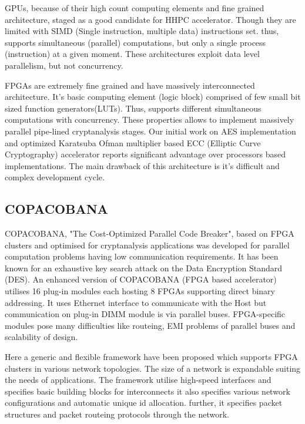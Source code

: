 \documentclass[10pt, conference, compsocconf]{IEEEtran}
\begin{document}
GPUs, because of their high count computing elements and fine grained architecture, staged as a good candidate for HHPC accelerator. Though they are limited with SIMD (Single instruction, multiple data) instructions set. thus, supports simultaneous (parallel) computations, but only a single process (instruction) at a given moment. These architectures exploit data level parallelism, but not concurrency.

FPGAs are extremely fine grained and have massively interconnected architecture. It's basic computing element (logic block) comprised of few small bit sized function generators(LUTs). Thus, supports different simultaneous computations with concurrency. These properties allows to implement massively parallel pipe-lined cryptanalysis stages. Our initial work on AES implementation\cite{bajpaidesign} and optimized Karatsuba Ofman multiplier \cite{Kapoor:2016:LOI:2916026.2916030} based ECC (Elliptic Curve Cryptography) accelerator reports significant advantage over processors based implementations. The main drawback of this architecture is it's difficult and complex development cycle.

\subsection{COPACOBANA\cite{guneysu2008enhancing}}
COPACOBANA, "The Cost-Optimized Parallel Code Breaker", based on FPGA clusters and optimised for cryptanalysis applications was developed for parallel computation problems having low communication requirements. It has been known for an exhaustive key search attack on the Data Encryption Standard (DES). An enhanced version of COPACOBANA (FPGA based accelerator) utilises 16 plug-in modules each hosting 8 FPGAs supporting direct binary addressing. It uses Ethernet interface to communicate with the Host but communication on plug-in DIMM module is via parallel buses. FPGA-specific modules pose many difficulties like routeing, EMI problems of parallel buses and scalability of design. 


Here a generic and flexible framework have been proposed which supports FPGA clusters in various network topologies. The size of a network is expandable suiting the needs of applications. The framework utilise high-speed interfaces and specifies basic building blocks for interconnects it also specifies various network configurations and automatic unique id allocation. further, it specifies packet structures and  packet routeing protocols through the network. 
\end{document}
